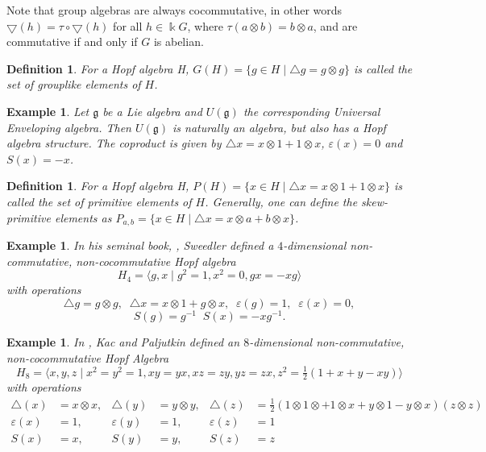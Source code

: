 \documentclass[12pt,a4paper]{article}
\newtheorem{example}[theorem]{Example}
\newtheorem{definition}[theorem]{Definition}
\newcommand{\kk}{\Bbbk}
\newcommand\1{_{(1)}}
\newcommand\2{_{(2)}}
\begin{document}
Note that group algebras are always cocommutative, in other words $\bigtriangledown(h)=\tau\circ\bigtriangledown(h)$ for all $h\in \kk G$, where $\tau(a\otimes b)=b\otimes a$, and are commutative if and only if $G$ is abelian.

\begin{definition}
    For a Hopf algebra H, $G(H)=\{g\in H\;\vert\; \triangle{g}=g\otimes g\}$ is called the set of grouplike elements of $H$.
\end{definition}

\begin{example}
    Let $\mathfrak{g}$ be a Lie algebra and $U(\mathfrak{g})$ the corresponding Universal Enveloping algebra.
    Then $U(\mathfrak{g})$ is naturally an algebra, but also has a Hopf algebra structure.
    The coproduct is given by $\triangle{x}=x\otimes 1+1\otimes x$, $\varepsilon(x)=0$ and $S(x)=-x$.
\end{example}

\begin{definition}
    For a Hopf algebra H, $P(H)=\{x\in H\;\vert\; \triangle{x}=x\otimes 1+1\otimes x\}$ is called the set of primitive elements of $H$.
    Generally, one can define the skew-primitive elements as $P_{a,b}=\{x\in H\;\vert\; \triangle{x}=x\otimes a+b\otimes x\}$.
\end{definition}

\begin{example}
    In his seminal book, \cite{Sw}, Sweedler defined a $4$-dimensional non-commutative, non-cocommutative Hopf algebra
    \[
    H_4=\langle g,x\;\vert\; g^2=1, x^2=0,gx=-xg\rangle
    \]
    with operations
    \[
    \triangle{g}=g\otimes g,\;\; \triangle{x}=x\otimes 1+g\otimes x,\;\;\varepsilon(g)=1,\;\;\varepsilon(x)=0,
    \]
    \[
    S(g)=g^{-1}\;\;S(x)=-xg^{-1}.
    \]
\end{example}

\begin{example}
 In \cite{KP}, Kac and Paljutkin defined an $8$-dimensional non-commutative, non-cocommutative Hopf Algebra
 \[
   H_8=\langle x,y,z\;\vert\; x^2=y^2=1,xy=yx,xz=zy,yz=zx,z^2=\tfrac{1}{2}(1+x+y-xy)\rangle 
 \]
 with operations
 \begin{align*}
   \triangle(x)&=x\otimes x, & \triangle(y)&=y\otimes y, & \triangle(z)&=\tfrac{1}{2}(1\otimes 1\otimes +1\otimes x+y\otimes 1-y\otimes x)(z\otimes z)\\
   \varepsilon(x)&=1, & \varepsilon(y)&=1, & \varepsilon(z)&=1\\
   S(x)&=x, & S(y)&=y, & S(z)&=z
 \end{align*}
\end{example}
\end{document}
